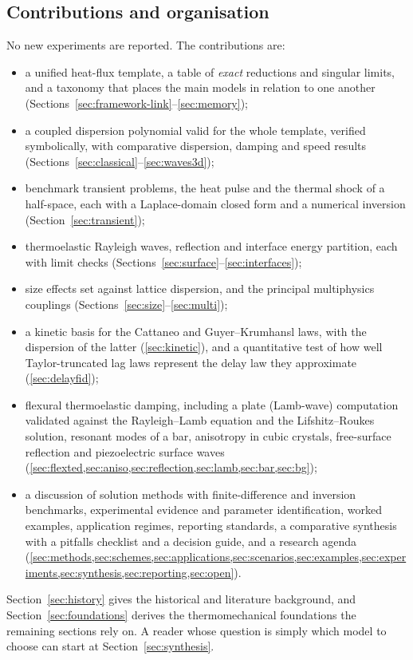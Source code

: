 \subsection{Contributions and organisation}
No new experiments are reported. The contributions are:
\begin{itemize}
\item a unified heat-flux template, a table of \emph{exact} reductions and singular limits, and a taxonomy that places the main models in relation to one another (Sections~\ref{sec:framework-link}--\ref{sec:memory});
\item a coupled dispersion polynomial valid for the whole template, verified symbolically, with comparative dispersion, damping and speed results (Sections~\ref{sec:classical}--\ref{sec:waves3d});
\item benchmark transient problems, the heat pulse and the thermal shock of a half-space, each with a Laplace-domain closed form and a numerical inversion (Section~\ref{sec:transient});
\item thermoelastic Rayleigh waves, reflection and interface energy partition, each with limit checks (Sections~\ref{sec:surface}--\ref{sec:interfaces});
\item size effects set against lattice dispersion, and the principal multiphysics couplings (Sections~\ref{sec:size}--\ref{sec:multi});
\item a kinetic basis for the Cattaneo and Guyer--Krumhansl laws, with the dispersion of the latter (\cref{sec:kinetic}), and a quantitative test of how well Taylor-truncated lag laws represent the delay law they approximate (\cref{sec:delayfid});
\item flexural thermoelastic damping, including a plate (Lamb-wave) computation validated against the Rayleigh--Lamb equation and the Lifshitz--Roukes solution, resonant modes of a bar, anisotropy in cubic crystals, free-surface reflection and piezoelectric surface waves (\cref{sec:flexted,sec:aniso,sec:reflection,sec:lamb,sec:bar,sec:bg});
\item a discussion of solution methods with finite-difference and inversion benchmarks, experimental evidence and parameter identification, worked examples, application regimes, reporting standards, a comparative synthesis with a pitfalls checklist and a decision guide, and a research agenda (\cref{sec:methods,sec:schemes,sec:applications,sec:scenarios,sec:examples,sec:experiments,sec:synthesis,sec:reporting,sec:open}).
\end{itemize}
Section~\ref{sec:history} gives the historical and literature background, and Section~\ref{sec:foundations} derives the thermomechanical foundations the remaining sections rely on. A reader whose question is simply which model to choose can start at Section~\ref{sec:synthesis}.

